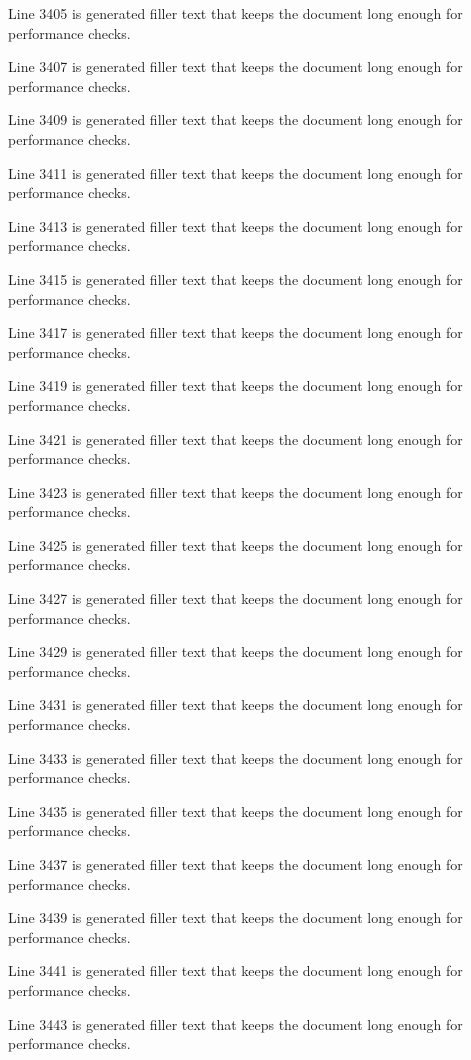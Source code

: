 Line 3405 is generated filler text that keeps the document long enough for performance checks.

Line 3407 is generated filler text that keeps the document long enough for performance checks.

Line 3409 is generated filler text that keeps the document long enough for performance checks.

Line 3411 is generated filler text that keeps the document long enough for performance checks.

Line 3413 is generated filler text that keeps the document long enough for performance checks.

Line 3415 is generated filler text that keeps the document long enough for performance checks.

Line 3417 is generated filler text that keeps the document long enough for performance checks.

Line 3419 is generated filler text that keeps the document long enough for performance checks.

Line 3421 is generated filler text that keeps the document long enough for performance checks.

Line 3423 is generated filler text that keeps the document long enough for performance checks.

Line 3425 is generated filler text that keeps the document long enough for performance checks.

Line 3427 is generated filler text that keeps the document long enough for performance checks.

Line 3429 is generated filler text that keeps the document long enough for performance checks.

Line 3431 is generated filler text that keeps the document long enough for performance checks.

Line 3433 is generated filler text that keeps the document long enough for performance checks.

Line 3435 is generated filler text that keeps the document long enough for performance checks.

Line 3437 is generated filler text that keeps the document long enough for performance checks.

Line 3439 is generated filler text that keeps the document long enough for performance checks.

Line 3441 is generated filler text that keeps the document long enough for performance checks.

Line 3443 is generated filler text that keeps the document long enough for performance checks.

